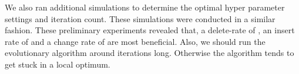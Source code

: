 \documentclass[./../../paper.tex]{subfiles}
\begin{document}
We also ran additional simulations to determine the optimal hyper parameter settings and iteration count. These simulations were conducted in a similar fashion. These preliminary experiments revealed that, a delete-rate of , an insert rate of  and a change rate of  are most beneficial. Also, we should run the evolutionary algorithm around  iterations long. Otherwise the algorithm tends to get stuck in a local optimum.
\end{document}
